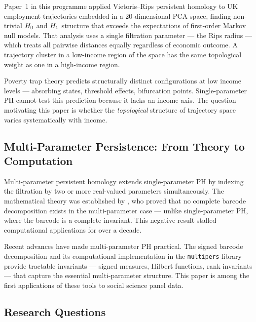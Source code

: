 Paper~1 in this programme applied Vietoris--Rips persistent homology to UK
employment trajectories embedded in a 20-dimensional PCA space, finding
non-trivial $H_{0}$ and $H_{1}$ structure that exceeds the expectations of
first-order Markov null models. That analysis uses a single filtration
parameter --- the Rips radius --- which treats all pairwise distances equally
regardless of economic outcome. A trajectory cluster in a low-income region
of the space has the same topological weight as one in a high-income region.

Poverty trap theory \citep{azariadis2005poverty, barrett2013economics}
predicts structurally distinct configurations at low income levels ---
absorbing states, threshold effects, bifurcation points. Single-parameter PH
cannot test this prediction because it lacks an income axis. The question
motivating this paper is whether the \emph{topological} structure of
trajectory space varies systematically with income.

\subsection{Multi-Parameter Persistence: From Theory to Computation}

Multi-parameter persistent homology extends single-parameter PH by indexing
the filtration by two or more real-valued parameters simultaneously. The
mathematical theory was established by \citet{carlsson2009theory}, who proved
that no complete barcode decomposition exists in the multi-parameter case ---
unlike single-parameter PH, where the barcode is a complete invariant. This
negative result stalled computational applications for over a decade.

Recent advances have made multi-parameter PH practical. The signed barcode
decomposition \citep{botnan2022signed} and its computational implementation
in the \texttt{multipers} library \citep{loiseaux2023framework, loiseaux2024multipers}
provide tractable invariants --- signed measures, Hilbert functions, rank
invariants --- that capture the essential multi-parameter structure. This
paper is among the first applications of these tools to social science panel
data.

\subsection{Research Questions}

